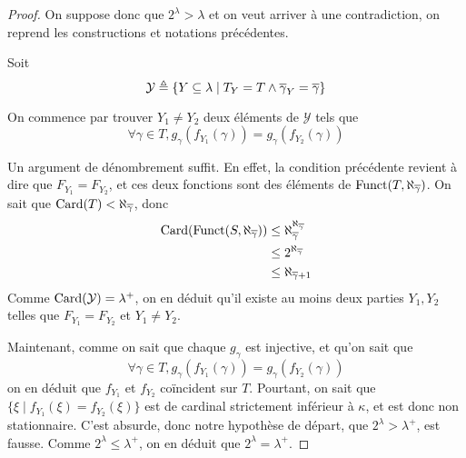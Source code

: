 \begin{proof}
  On suppose donc que $2^\lambda > \lambda$ et on veut arriver à une
  contradiction, on reprend les constructions et notations précédentes.

  Soit
  \[\mathcal Y \triangleq \{Y\subseteq \lambda\mid T_Y = T \land
  \overline\gamma_Y = \overline\gamma\}\]

  On commence par trouver $Y_1\neq Y_2$ deux éléments de $\mathcal Y$ tels que
  \[\forall \gamma \in T, g_\gamma(f_{Y_1}(\gamma)) = g_\gamma(f_{Y_2}(\gamma))\]

  Un argument de dénombrement suffit. En effet, la condition précédente revient
  à dire que $F_{Y_1} = F_{Y_2}$, et ces deux fonctions sont des éléments de
  $\operatorname{Funct}(T,\aleph_{\overline\gamma})$. On sait que
  $\operatorname{Card}(T) < \aleph_{\overline\gamma}$, donc
  \begin{align*}
    \operatorname{Card}(\operatorname{Funct}(S,\aleph_{\overline\gamma})) &
    \leq \aleph_{\overline\gamma}^{\aleph_{\overline\gamma}}\\
    &\leq 2^{\aleph_{\overline\gamma}} \\
    &\leq \aleph_{\overline\gamma + 1}
  \end{align*}
  Comme $\operatorname{Card}(\mathcal Y) = \lambda^+$, on en déduit qu'il existe au moins
  deux parties $Y_1,Y_2$ telles que $F_{Y_1} = F_{Y_2}$ et $Y_1\neq Y_2$.

  Maintenant, comme on sait que chaque $g_\gamma$ est injective, et qu'on sait
  que
  \[\forall \gamma\in T, g_\gamma(f_{Y_1}(\gamma)) = g_\gamma(f_{Y_2}(\gamma))\]
  on en déduit que $f_{Y_1}$ et $f_{Y_2}$ coïncident sur $T$. Pourtant, on sait
  que $\{\xi\mid f_{Y_1}(\xi) = f_{Y_2}(\xi)\}$ est de cardinal strictement
  inférieur à $\kappa$, et est donc non stationnaire. C'est absurde, donc
  notre hypothèse de départ, que $2^\lambda > \lambda^+$, est fausse. Comme
  $2^\lambda \leq \lambda^+$, on en déduit que $2^\lambda = \lambda^+$.
\end{proof}
